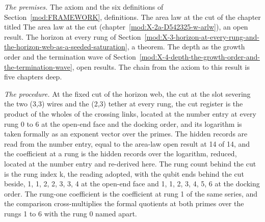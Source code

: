 \begin{chproof}
\textit{The premises.} The axiom and the six definitions of Section~\ref{mod:FRAMEWORK}, definitions. The area law at the cut of the chapter titled The area law at the cut (chapter~\ref{mod:X-2a-D542325-w-arlw}), an open result. The horizon at every rung of Section~\ref{mod:X-3-horizon-at-every-rung-and-the-horizon-web-as-a-seeded-saturation}, a theorem. The depth as the growth order and the termination wave of Section~\ref{mod:X-4-depth-the-growth-order-and-the-termination-wave}, open results. The chain from the axiom to this result is five chapters deep.

\textit{The procedure.} At the fixed cut of the horizon web, the cut at the slot severing the two (3,3) wires and the (2,3) tether at every rung, the cut register is the product of the wholes of the crossing links, located at the number entry at every rung 0 to 6 at the open-end face and the docking order, and its logarithm is taken formally as an exponent vector over the primes. The hidden records are read from the number entry, equal to the area-law open result at 14 of 14, and the coefficient at a rung is the hidden records over the logarithm, reduced, located at the number entry and re-derived here. The rung count behind the cut is the rung index k, the reading adopted, with the qubit ends behind the cut beside, 1, 1, 2, 2, 3, 3, 4 at the open-end face and 1, 1, 2, 3, 4, 5, 6 at the docking order. The rung-one coefficient is the coefficient at rung 1 of the same series, and the comparison cross-multiplies the formal quotients at both primes over the rungs 1 to 6 with the rung 0 named apart.


\end{chproof}
